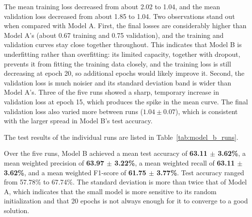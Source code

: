 \documentclass[12pt,a4paper]{article}
\begin{document}
The mean training loss decreased from about 2.02 to 1.04, and the mean
validation loss decreased from about 1.85 to 1.04. Two observations
stand out when compared with Model A. First, the final losses are
considerably higher than Model A's (about 0.67 training and 0.75
validation), and the training and validation curves stay close together
throughout. This indicates that Model B is underfitting rather than
overfitting: its limited capacity, together with dropout, prevents it
from fitting the training data closely, and the training loss is still
decreasing at epoch 20, so additional epochs would likely improve it.
Second, the validation loss is much noisier and its standard deviation
band is wider than Model A's. Three of the five runs showed a sharp,
temporary increase in validation loss at epoch 15, which produces the
spike in the mean curve. The final validation loss also varied more
between runs ($1.04\pm0.07$), which is consistent with the larger spread
in Model B's test accuracy.

The test results of the individual runs are listed in
Table~\ref{tab:model_b_runs}.

\begin{table}[H]
\centering
\caption{Test performance of Model B over five independent runs}
\label{tab:model_b_runs}
\end{table}

Over the five runs, Model B achieved a mean test accuracy of
\textbf{63.11 $\pm$ 3.62\%}, a mean weighted precision of
\textbf{63.97 $\pm$ 3.22\%}, a mean weighted recall of
\textbf{63.11 $\pm$ 3.62\%}, and a mean weighted F1-score of
\textbf{61.75 $\pm$ 3.77\%}. Test accuracy ranged from 57.78\% to
67.74\%. The standard deviation is more than twice that of Model A,
which indicates that the small model is more sensitive to its random
initialization and that 20 epochs is not always enough for it to converge
to a good solution.
\end{document}
